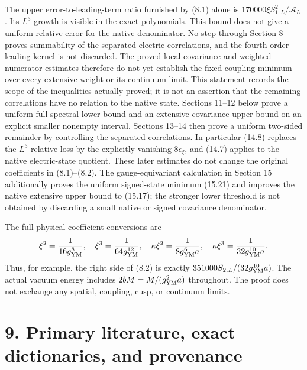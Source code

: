 \documentclass[
]{article}
\begin{document}
The upper error-to-leading-term ratio furnished by (8.1) alone is
\(170000\xi S_{1,L}^2/\mathcal A_L\). Its \(L^3\) growth is visible in
the exact polynomials. This bound does not give a uniform relative error
for the native denominator. No step through Section 8 proves summability
of the separated electric correlations, and the fourth-order leading
kernel is not discarded. The proved local covariance and weighted
numerator estimates therefore do not yet establish the fixed-coupling
minimum over every extensive weight or its continuum limit. This
statement records the scope of the inequalities actually proved; it is
not an assertion that the remaining correlations have no relation to the
native state. Sections 11--12 below prove a uniform full spectral lower
bound and an extensive covariance upper bound on an explicit smaller
nonempty interval. Sections 13--14 then prove a uniform two-sided
remainder by controlling the separated correlations. In particular
(14.8) replaces the \(L^3\) relative loss by the explicitly vanishing
\(8\epsilon_\xi\), and (14.7) applies to the native electric-state
quotient. These later estimates do not change the original coefficients
in (8.1)--(8.2). The gauge-equivariant calculation in Section 15
additionally proves the uniform signed-state minimum (15.21) and
improves the native extensive upper bound to (15.17); the stronger lower
threshold is not obtained by discarding a small native or signed
covariance denominator.

The full physical coefficient conversions are \[
\xi^2=\frac1{16g_{\rm YM}^8},\quad
\xi^3=\frac1{64g_{\rm YM}^{12}},\quad
\kappa\xi^2=\frac1{8g_{\rm YM}^6a},\quad
\kappa\xi^3=\frac1{32g_{\rm YM}^{10}a}.
\] Thus, for example, the right side of (8.2) is exactly
\(351000S_{2,L}/(32g_{\rm YM}^{10}a)\). The actual vacuum energy
includes \(2bM=M/(g_{\rm YM}^2a)\) throughout. The proof does not
exchange any spatial, coupling, cusp, or continuum limits.

\section{9. Primary literature, exact dictionaries, and
provenance}\label{primary-literature-exact-dictionaries-and-provenance}
\end{document}

